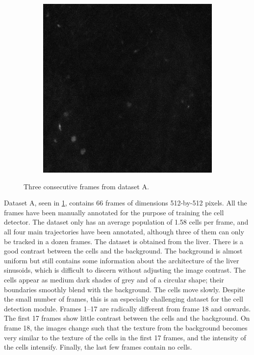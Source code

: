 \begin{figure}[h]
\begin{subfigure}{.32\textwidth}
   		\end{subfigure}
   		\hfill
   		\begin{subfigure}{.32\textwidth}
   		\includegraphics[width=\textwidth]{images/series30green021}
   		\end{subfigure}
   		\caption{Three consecutive frames from dataset A.}
   		\label{fig:data_datasetA}
   	\end{figure}
   	  	
   	Dataset A, seen in \cref{fig:data_datasetA}, contains 66 frames of dimensions 512-by-512 pixels. All the frames have been manually annotated for the purpose of training the cell detector. The dataset only has an average population of 1.58 cells per frame, and all four main trajectories have been annotated, although three of them can only be tracked in a dozen frames. The dataset is obtained from the liver. There is a good contrast between the cells and the background. The background is almost uniform but still contains some information about the architecture of the liver sinusoids, which is difficult to discern without adjusting the image contrast. The cells appear as medium dark shades of grey and of a circular shape; their boundaries smoothly blend with the background. The cells move slowly. Despite the small number of frames, this is an especially challenging dataset for the cell detection module. Frames 1--17 are radically different from frame 18 and onwards. The first 17 frames show little contrast between the cells and the background. On frame 18, the images change such that the texture from the background becomes very similar to the texture of the cells in the first 17 frames, and the intensity of the cells intensify. Finally, the last few frames contain no cells.
   	   	
